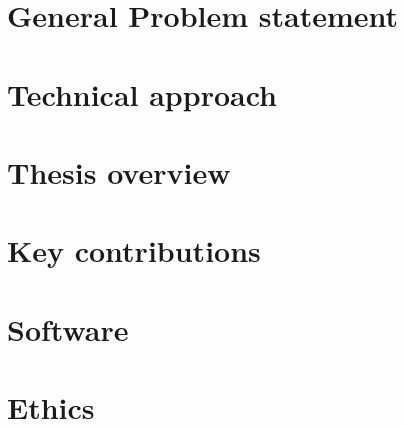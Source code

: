 \section{General Problem statement}\label{section:generalproblemstatment}
\section{Technical approach}\label{section:technicalapproach}
\section{Thesis overview}\label{section:thesisoverview}
\section{Key contributions}\label{section:keycontributions}
\section{Software}\label{section:software}
\section{Ethics}\label{section:ethics}